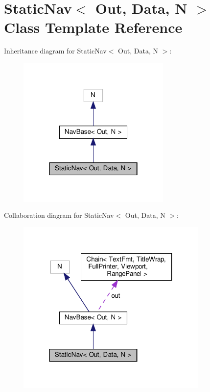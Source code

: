 \hypertarget{classStaticNav}{}\section{Static\+Nav$<$ Out, Data, N $>$ Class Template Reference}
\label{classStaticNav}


Inheritance diagram for Static\+Nav$<$ Out, Data, N $>$\+:\nopagebreak
\begin{figure}[H]
\begin{center}
\leavevmode
\includegraphics[width=214pt]{classStaticNav__inherit__graph}
\end{center}
\end{figure}


Collaboration diagram for Static\+Nav$<$ Out, Data, N $>$\+:\nopagebreak
\begin{figure}[H]
\begin{center}
\leavevmode
\includegraphics[width=268pt]{classStaticNav__coll__graph}
\end{center}
\end{figure}
